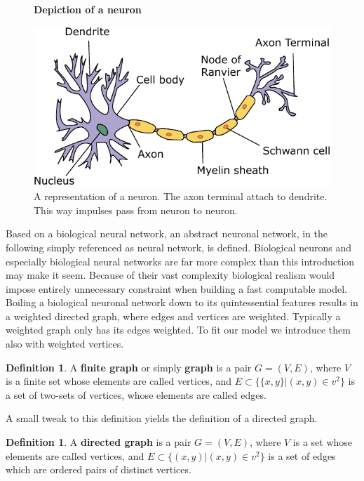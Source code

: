 \documentclass{article}
\theoremstyle{definition}
\newtheorem{definition}[theorem]{Definition}
\newcommand*{\figuretitle}[1]{%
    {\centering%
    \textbf{#1}%
    \par\medskip}%
}
\begin{document}
\begin{figure}[H]
\centering
\figuretitle{Depiction of a neuron}
\includegraphics[scale=0.75]{graphics/neuron.pdf}
\caption{A representation of a neuron. The axon terminal attach to dendrite. This way impulses pass from neuron to neuron\cite{neuron2020}.}
\label{fig:neuron}
\end{figure}

Based on a biological neural network, an abstract neuronal network, in the following simply referenced as neural network, is defined. Biological neurons and especially biological neural networks are far more complex than this introduction may make it seem. Because of their vast complexity biological realism would impose entirely unnecessary constraint when building a fast computable model. Boiling a biological neuronal network down to its quintessential features results in a weighted directed graph, where edges and vertices are weighted. Typically a weighted graph only has its edges weighted. To fit our model we introduce them also with weighted vertices.

\begin{definition}\cite[p.~148]{bender2010lists}
A \textbf{finite graph} or simply \textbf{graph} is a pair $G = (V, E)$, where $V$ is a finite set whose elements are called vertices, and $E \subset \{ \{x, y\}|(x,y) \in v^{2} \}$ is a set of two-sets of vertices, whose elements are called edges.
\end{definition}

A small tweak to this definition yields the definition of a directed graph.

\begin{definition}
A \textbf{directed graph} is a pair $G = (V, E)$, where $V$ is a set whose elements are called vertices, and $E \subset \{ (x, y)|(x,y) \in v^{2} \}$ is a set of edges which are ordered pairs of distinct vertices.
\end{definition}
\end{document}
